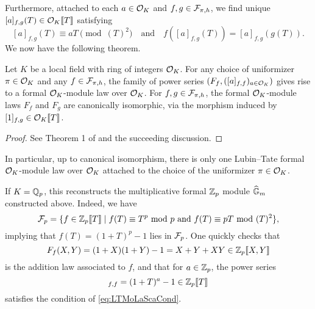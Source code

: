 Furthermore, attached to each $a \in \mathcal{O}_K$ and $f,g \in \mathcal{F}_{\pi,h}$, we find
unique $[a]_{f,g}(T) \in \mathcal{O}_K\llbracket T \rrbracket$ satisfying
\begin{equation}\label{eq:LTMoLaScaCond}
  [a]_{f,g}(T) \equiv aT \pmod {(T)^2} \quad \text{and} \quad
  f([a]_{f,g}(T)) = [a]_{f,g}(g(T)).
\end{equation}
We now have the following theorem.
\begin{thm}\label{thm:LTModLaw}
  Let $K$ be a local field with ring of integers $\mathcal{O}_K$. For any choice of 
  uniformizer $\pi \in \mathcal{O}_K$ and any $f \in \mathcal{F}_{\pi,h}$, the family of power
  series $(F_f, ([a]_{f,f})_{a \in \mathcal{O}_K})$
  gives rise to a formal $\mathcal{O}_K$-module law over $\mathcal{O}_K$. For 
  $f,g \in \mathcal{F}_{\pi,h}$, the formal $\mathcal{O}_K$-module laws $F_f$ and $F_g$ are
  canonically isomorphic, via the morphism induced by $[1]_{f,g} \in \mathcal{O}_K\llbracket
  T \rrbracket$. 
\begin{proof}
  See Theorem 1 of \cite{LubinTateFormalMult} and the succeeding discussion.
\end{proof}
\end{thm}
In particular, up to canonical isomorphism, there is only one Lubin--Tate formal
$\mathcal{O}_K$-module law over $\mathcal{O}_K$ attached to the choice of the uniformizer $\pi \in
\mathcal{O}_K$. 

\begin{xpl}
  If $K = \mathbb{Q}_p$, this reconstructs the multiplicative formal 
  $\mathbb{Z}_p$ module $\widehat{\mathbb{G}}_m$ constructed above. Indeed, we have 
  \begin{equation*}
    \mathcal{F}_p = \{f \in \mathbb{Z}_p\llbracket T \rrbracket \mid f(T) \equiv T^p \text{ mod } p
    \text{ and } f(T) \equiv pT \text{ mod } (T)^2 \},
  \end{equation*}
  implying that $f(T) = (1+T)^p-1$ lies in $\mathcal{F}_p$.  
  One quickly checks that 
  \begin{equation*}
    F_f(X,Y) = (1+X)(1+Y) - 1 = X + Y + XY \in \mathbb{Z}_p \llbracket X,Y \rrbracket
  \end{equation*}
  is the addition law associated to $f$, and that 
  for $a \in \mathbb{Z}_p$, the power series
  \begin{equation*}
    [a]_{f,f} = (1+T)^{a} - 1 \in \Z_p \llbr T \rrbr
  \end{equation*}
  satisfies the condition of \eqref{eq:LTMoLaScaCond}. 
\end{xpl}



